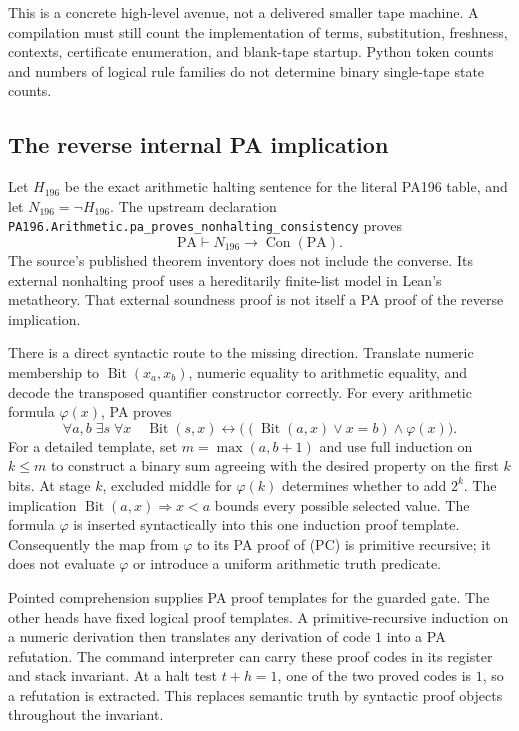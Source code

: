 This is a concrete high-level avenue, not a delivered smaller tape
machine.  A compilation must still count the implementation of terms,
substitution, freshness, contexts, certificate enumeration, and
blank-tape startup.  Python token counts and numbers of logical rule
families do not determine binary single-tape state counts.

\subsection{The reverse internal PA implication}

Let $H_{196}$ be the exact arithmetic halting sentence for the literal
PA196 table, and let $N_{196}=\neg H_{196}$.
The upstream declaration
\texttt{PA196.Arithmetic.pa\_proves\_nonhalting\_consistency}
proves
\[
 \mathrm{PA}\vdash N_{196}\to\operatorname{Con}(\mathrm{PA}).
\]
The source's published theorem inventory does not include the converse.
Its external nonhalting proof uses a hereditarily finite-list model in
Lean's metatheory.  That external soundness proof is not itself a PA
proof of the reverse implication.

There is a direct syntactic route to the missing direction.  Translate
numeric membership to $\operatorname{Bit}(x_a,x_b)$, numeric equality to
arithmetic equality, and decode the transposed quantifier constructor
correctly.  For every arithmetic formula $\varphi(x)$, PA proves
\[
 \forall a,b\;\exists s\;\forall x\quad
 \operatorname{Bit}(s,x)\leftrightarrow
 \bigl((\operatorname{Bit}(a,x)\lor x=b)\land\varphi(x)\bigr).
 \tag{PC}
\]
For a detailed template, set $m=\max(a,b+1)$ and use full induction on
$k\le m$ to construct a binary sum agreeing with the desired property
on the first $k$ bits.  At stage $k$, excluded middle for
$\varphi(k)$ determines whether to add $2^k$.  The implication
$\operatorname{Bit}(a,x)\Rightarrow x<a$ bounds every possible selected
value.  The formula $\varphi$ is inserted syntactically into this one
induction proof template.  Consequently the map from $\varphi$ to its
PA proof of \textup{(PC)} is primitive recursive; it does not evaluate
$\varphi$ or introduce a uniform arithmetic truth predicate.

Pointed comprehension supplies PA proof templates for the guarded
gate.  The other heads have fixed logical proof templates.  A
primitive-recursive induction on a numeric derivation then translates
any derivation of code $1$ into a PA refutation.  The command interpreter
can carry these proof codes in its register and stack invariant.  At a
halt test $t+h=1$, one of the two proved codes is $1$, so a refutation is
extracted.  This replaces semantic truth by syntactic proof objects
throughout the invariant.


